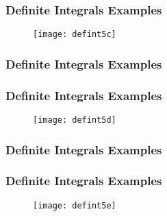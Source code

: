 \documentclass{beamer}
\begin{document}
	\begin{frame}
		\frametitle{Definite Integrals Examples}
		\begin{figure}
			\centering
			\texttt{[image: defint5c]}
			
		\end{figure}
		
	\end{frame}
	\begin{frame}
		\frametitle{Definite Integrals Examples}
		
	\end{frame}
	\begin{frame}
		\frametitle{Definite Integrals Examples}
		\begin{figure}
			\centering
			\texttt{[image: defint5d]}
			
		\end{figure}
		
	\end{frame}
	\begin{frame}
		\frametitle{Definite Integrals Examples}
		
	\end{frame}
	
	\begin{frame}
		\frametitle{Definite Integrals Examples}
		\begin{figure}
			\centering
			\texttt{[image: defint5e]}
			
		\end{figure}
		
	\end{frame}
	
\end{document}

